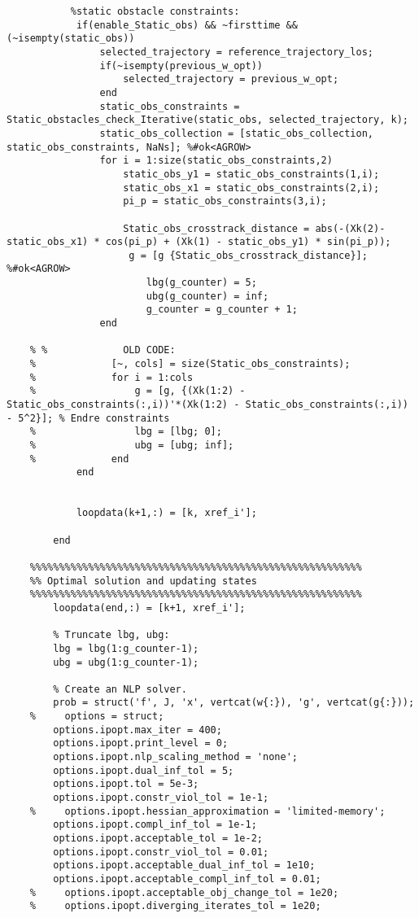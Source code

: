 \begin{lstlisting}
           %static obstacle constraints:
            if(enable_Static_obs) && ~firsttime && (~isempty(static_obs))
                selected_trajectory = reference_trajectory_los;
                if(~isempty(previous_w_opt))
                    selected_trajectory = previous_w_opt;
                end
                static_obs_constraints = Static_obstacles_check_Iterative(static_obs, selected_trajectory, k);
                static_obs_collection = [static_obs_collection, static_obs_constraints, NaNs]; %#ok<AGROW> 
                for i = 1:size(static_obs_constraints,2)
                    static_obs_y1 = static_obs_constraints(1,i);
                    static_obs_x1 = static_obs_constraints(2,i);
                    pi_p = static_obs_constraints(3,i);
                    
                    Static_obs_crosstrack_distance = abs(-(Xk(2)-static_obs_x1) * cos(pi_p) + (Xk(1) - static_obs_y1) * sin(pi_p));
                     g = [g {Static_obs_crosstrack_distance}]; %#ok<AGROW> 
                        lbg(g_counter) = 5;
                        ubg(g_counter) = inf;
                        g_counter = g_counter + 1;
                end
                
    % %             OLD CODE:
    %             [~, cols] = size(Static_obs_constraints);
    %             for i = 1:cols
    %                 g = [g, {(Xk(1:2) - Static_obs_constraints(:,i))'*(Xk(1:2) - Static_obs_constraints(:,i)) - 5^2}]; % Endre constraints
    %                 lbg = [lbg; 0];
    %                 ubg = [ubg; inf];
    %             end
            end
            
            
            loopdata(k+1,:) = [k, xref_i'];
            
        end
        
    %%%%%%%%%%%%%%%%%%%%%%%%%%%%%%%%%%%%%%%%%%%%%%%%%%%%%%%%%
    %% Optimal solution and updating states
    %%%%%%%%%%%%%%%%%%%%%%%%%%%%%%%%%%%%%%%%%%%%%%%%%%%%%%%%%
        loopdata(end,:) = [k+1, xref_i'];
    
        % Truncate lbg, ubg:
        lbg = lbg(1:g_counter-1);
        ubg = ubg(1:g_counter-1);
    
        % Create an NLP solver.
        prob = struct('f', J, 'x', vertcat(w{:}), 'g', vertcat(g{:}));
    %     options = struct;
        options.ipopt.max_iter = 400;
        options.ipopt.print_level = 0;
        options.ipopt.nlp_scaling_method = 'none';
        options.ipopt.dual_inf_tol = 5;
        options.ipopt.tol = 5e-3;
        options.ipopt.constr_viol_tol = 1e-1;
    %     options.ipopt.hessian_approximation = 'limited-memory';
        options.ipopt.compl_inf_tol = 1e-1;
        options.ipopt.acceptable_tol = 1e-2;
        options.ipopt.constr_viol_tol = 0.01;
        options.ipopt.acceptable_dual_inf_tol = 1e10;
        options.ipopt.acceptable_compl_inf_tol = 0.01;
    %     options.ipopt.acceptable_obj_change_tol = 1e20;
    %     options.ipopt.diverging_iterates_tol = 1e20;
    

\end{lstlisting}
